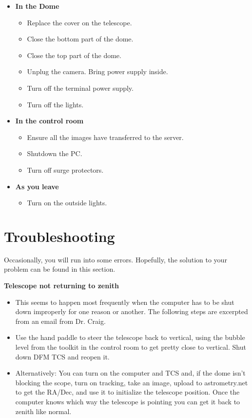 \documentclass[letterpaper, 12pt]{report}
\begin{document}
\begin{itemize}
	\item {\large \textbf{In the Dome}}
	\begin{itemize}
		\item Replace the cover on the telescope.
		\item Close the bottom part of the dome.
		\item Close the top part of the dome.
		\item Unplug the camera. Bring power supply inside.
		\item Turn off the terminal power supply.
		\item Turn off the lights.
	\end{itemize}

	\item {\large \textbf{In the control room}}
	\begin{itemize}
		\item Ensure all the images have transferred to the server.
		\item Shutdown the PC.
		\item Turn off surge protectors.
	\end{itemize}

\item {\large \textbf{As you leave}}
\begin{itemize}
	\item Turn on the outside lights.
\end{itemize}
\end{itemize}
\newpage
\chapter{Troubleshooting}
Occasionally, you will run into some errors. Hopefully, the solution to your problem can be found in this section.

\noindent\textbf{Telescope not returning to zenith}
\begin{itemize}
	\item This seems to happen most frequently when the computer has to be shut down improperly for one reason or another. The following steps are excerpted from an email from Dr. Craig.
	\item Use the hand paddle to steer the telescope back to vertical, using the bubble level from the toolkit in the control room to get pretty close to vertical. Shut down DFM TCS and reopen it.
	\item Alternatively: You can turn on the computer and TCS and, if the dome isn’t blocking the scope, turn on tracking, take an image, upload to astrometry.net to get the RA/Dec, and use it to initialize the telescope position. Once the computer knows which way the telescope is pointing you can get it back to zenith like normal.
\end{itemize}
\end{document}
